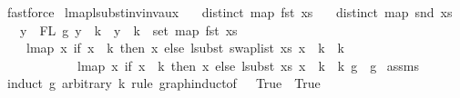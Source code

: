 \begin{isabellebody}
\ fastforce%
\endisatagproof
{\isafoldproof}%
%
\isadelimproof
\isanewline
%
\endisadelimproof
\isanewline
\isanewline
{}\isamarkupfalse%
\ lmap{\isacharunderscore}{\kern0pt}lsubst{\isacharunderscore}{\kern0pt}inv{\isacharunderscore}{\kern0pt}inv{\isacharunderscore}{\kern0pt}aux{}{\isacharcolon}{\kern0pt}\isanewline
\ \ \ {\isachardoublequoteopen}distinct\ {\isacharparenleft}{\kern0pt}map\ fst\ xs{\isacharparenright}{\kern0pt}{\isachardoublequoteclose}\isanewline
\ \ \ {\isachardoublequoteopen}distinct\ {\isacharparenleft}{\kern0pt}map\ snd\ xs{\isacharparenright}{\kern0pt}{\isachardoublequoteclose}\isanewline
\ \ \ {\isachardoublequoteopen}{\isasymforall}y\ {\isasymin}\ FL\ g{\isachardot}{\kern0pt}\ y\ {\isachargreater}{\kern0pt}{\isacharequal}{\kern0pt}\ k\ {\isacharminus}{\kern0pt}{\isacharminus}{\kern0pt}{\isachargreater}{\kern0pt}\ y\ {\isacharminus}{\kern0pt}\ k\ {\isasymin}\ set\ {\isacharparenleft}{\kern0pt}map\ fst\ xs{\isacharparenright}{\kern0pt}{\isachardoublequoteclose}\isanewline
\ \ \ \ {\isachardoublequoteopen}lmap\ {\isacharparenleft}{\kern0pt}{\isasymlambda}x{\isachardot}{\kern0pt}\ if\ x\ {\isacharless}{\kern0pt}\ k\ then\ x\ else\ {\isacharparenleft}{\kern0pt}lsubst\ {\isacharparenleft}{\kern0pt}swap{\isacharunderscore}{\kern0pt}list\ xs{\isacharparenright}{\kern0pt}\ {\isacharparenleft}{\kern0pt}x\ {\isacharminus}{\kern0pt}\ k{\isacharparenright}{\kern0pt}\ {\isacharplus}{\kern0pt}\ k{\isacharparenright}{\kern0pt}{\isacharparenright}{\kern0pt}\isanewline
\ \ \ \ \ \ \ \ \ \ \ \ {\isacharparenleft}{\kern0pt}lmap\ {\isacharparenleft}{\kern0pt}{\isasymlambda}x{\isachardot}{\kern0pt}\ if\ x\ {\isacharless}{\kern0pt}\ k\ then\ x\ else\ {\isacharparenleft}{\kern0pt}lsubst\ xs\ {\isacharparenleft}{\kern0pt}x\ {\isacharminus}{\kern0pt}\ k{\isacharparenright}{\kern0pt}\ {\isacharplus}{\kern0pt}\ k{\isacharparenright}{\kern0pt}{\isacharparenright}{\kern0pt}\ g{\isacharparenright}{\kern0pt}\ {\isacharequal}{\kern0pt}\ g{\isachardoublequoteclose}\isanewline
%
\isadelimproof
%
\endisadelimproof
%
\isatagproof
{}\isamarkupfalse%
\ assms\isanewline
{}\isamarkupfalse%
\ {\isacharparenleft}{\kern0pt}induct\ g\ arbitrary{\isacharcolon}{\kern0pt}\ k\ rule{\isacharcolon}{\kern0pt}\ graph{\isachardot}{\kern0pt}induct{\isacharbrackleft}{\kern0pt}of\ {\isacharunderscore}{\kern0pt}\ {\isachardoublequoteopen}{\isacharpercent}{\kern0pt}{\isacharunderscore}{\kern0pt}{\isachardot}{\kern0pt}\ True{\isachardoublequoteclose}\ {\isachardoublequoteopen}{\isacharpercent}{\kern0pt}{\isacharunderscore}{\kern0pt}{\isachardot}{\kern0pt}\ True{\isachardoublequoteclose}{\isacharbrackright}{\kern0pt}{\isacharparenright}{\kern0pt}\isanewline

\end{isabellebody}

